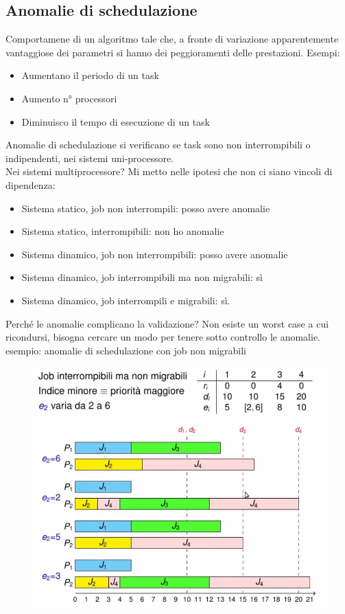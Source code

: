 \documentclass[12pt, oneside]{extbook}
\begin{document}
\subsection{Anomalie di schedulazione}
Comportamene di un algoritmo tale che, a fronte di variazione apparentemente vantaggiose dei parametri si hanno dei peggioramenti delle prestazioni. Esempi:
\begin{itemize}
\item Aumentano il periodo di un task
\item Aumento n° processori
\item Diminuisco il tempo di esecuzione di un task
\end{itemize}
Anomalie di schedulazione si verificano se task sono non interrompibili o indipendenti, nei sistemi uni-processore.\\ Nei sistemi multiprocessore? Mi metto nelle ipotesi che non ci siano vincoli di dipendenza:\\
\begin{itemize}
\item Sistema statico, job non interrompili: posso avere anomalie
\item Sistema statico, interrompibili: non ho anomalie
\item Sistema dinamico, job non interrompibili: posso avere anomalie
\item Sistema dinamico, job interrompibili ma non migrabili: sì
\item Sistema dinamico, job interrompili e migrabili: sì.
\end{itemize}
Perché le anomalie complicano la validazione? Non esiste un worst case a cui ricondursi, bisogna cercare un modo per tenere sotto controllo le anomalie.\\ esempio: anomalie di schedulazione con job non migrabili\\
\begin{figure}[!h]
\centering
\includegraphics[scale=0.4]{immagini/image-039.jpg}
\end{figure}
\end{document}
